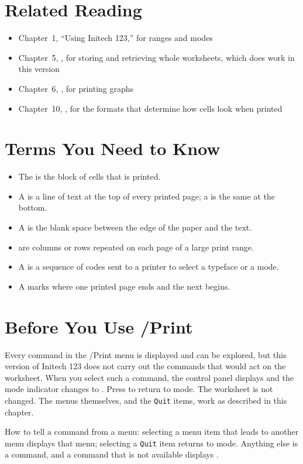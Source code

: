 \section{Related Reading}
\begin{itemize}
\item Chapter~1, ``Using Initech 123,'' for ranges and modes
\item Chapter~5, , for storing and retrieving whole worksheets, which does work in this version
\item Chapter~6, , for printing graphs
\item Chapter~10, , for the formats that determine how cells look when printed
\end{itemize}

\section{Terms You Need to Know}
\begin{itemize}
\item The  is the block of cells that is printed.
\item A  is a line of text at the top of every printed page; a  is the same at the bottom.
\item A  is the blank space between the edge of the paper and the text.
\item {} are columns or rows repeated on each page of a large print range.
\item A  is a sequence of codes sent to a printer to select a typeface or a mode.
\item A  marks where one printed page ends and the next begins.
\end{itemize}

\section{Before You Use /Print}
\begin{Note}
Every command in the /Print menu is displayed and can be explored, but this
version of Initech 123 does not carry out the commands that would act on the
worksheet.  When you select such a command, the control panel displays
 and the mode indicator changes to
.  Press  to return to  mode.  The worksheet
is not changed.  The menus themselves, and the \texttt{Quit} items, work as
described in this chapter.
\end{Note}
How to tell a command from a menu: selecting a menu item that leads to another
menu displays that menu; selecting a \texttt{Quit} item returns to
 mode.  Anything else is a command, and a command that is not
available displays .


